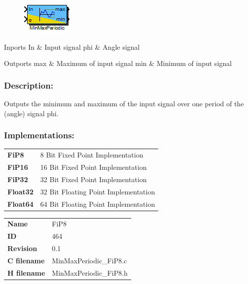 \label{block:MinMaxPeriodic}
\begin{figure}[H]\includegraphics{MinMaxPeriodic}\end{figure} 

\begin{XtoCtabular}{Inports}
In & Input signal\tabularnewline
\hline
phi & Angle signal\tabularnewline
\hline
\end{XtoCtabular}


\begin{XtoCtabular}{Outports}
max & Maximum of input signal\tabularnewline
\hline
min & Minimum of input signal\tabularnewline
\hline
\end{XtoCtabular}

\subsubsection*{Description:}
Outputs the minimum and maximum of the input signal over one period of the (angle) signal phi.


\subsubsection*{Implementations:}
\begin{tabular}{l l}
\textbf{FiP8} & 8 Bit Fixed Point Implementation\tabularnewline
\textbf{FiP16} & 16 Bit Fixed Point Implementation\tabularnewline
\textbf{FiP32} & 32 Bit Fixed Point Implementation\tabularnewline
\textbf{Float32} & 32 Bit Floating Point Implementation\tabularnewline
\textbf{Float64} & 64 Bit Floating Point Implementation\tabularnewline
\end{tabular}

\nopagebreak[0]
\begin{tabular}{l l}
\textbf{Name} & FiP8 \tabularnewline
\textbf{ID} & 464 \tabularnewline
\textbf{Revision} & 0.1 \tabularnewline
\textbf{C filename} & MinMaxPeriodic\_FiP8.c \tabularnewline
\textbf{H filename} & MinMaxPeriodic\_FiP8.h \tabularnewline
\end{tabular}
\vspace{1ex}

